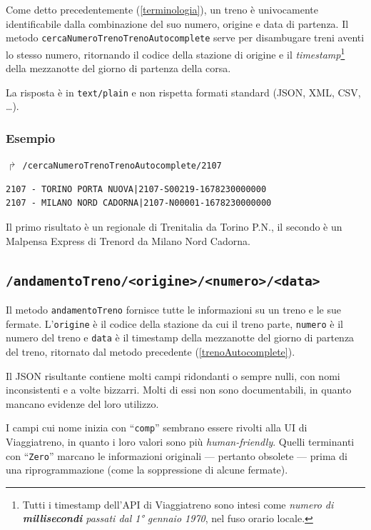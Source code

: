 \documentclass[12pt,italian]{report}
\begin{document}
Come detto precedentemente (\ref{terminologia}), un treno è
univocamente identificabile dalla combinazione del suo numero, origine
e data di partenza.  Il metodo
\texttt{cerca\-Numero\-Treno\-Treno\-Autocomplete} serve per
disambugare treni aventi lo stesso numero, ritornando il codice della
stazione di origine e il
\textit{timestamp}\footnote{\label{timestamp}Tutti i timestamp
    dell'API di Viaggiatreno sono intesi come \textit{numero di
        \textbf{millisecondi} passati dal 1° gennaio 1970}, nel fuso
    orario locale.} della mezzanotte del giorno di partenza della
corsa.

La risposta è in \texttt{text/plain} e non rispetta formati standard
(JSON, XML, CSV, \dots).

\subsubsection{Esempio}

$\Rsh$ \texttt{/cercaNumeroTrenoTrenoAutocomplete/2107}

\begin{verbatim}
2107 - TORINO PORTA NUOVA|2107-S00219-1678230000000
2107 - MILANO NORD CADORNA|2107-N00001-1678230000000
\end{verbatim}

Il primo risultato è un regionale di Trenitalia da Torino P.N., il
secondo è un Malpensa Express di Trenord da Milano Nord Cadorna.

\subsection{\texttt{/andamentoTreno/<origine>/<numero>/<data>}}
\label{andamentoTreno}

Il metodo \texttt{andamentoTreno} fornisce tutte le informazioni su un
treno e le sue fermate.  L'\texttt{origine} è il codice della stazione
da cui il treno parte, \texttt{numero} è il numero del treno e
\texttt{data} è il timestamp della mezzanotte del giorno di partenza
del treno, ritornato dal metodo precedente (\ref{trenoAutocomplete}).

Il JSON risultante contiene molti campi ridondanti o sempre nulli, con
nomi inconsistenti e a volte bizzarri.  Molti di essi non sono
documentabili, in quanto mancano evidenze del loro utilizzo.

I campi cui nome inizia con ``\texttt{comp}'' sembrano essere rivolti
alla UI di Viaggiatreno, in quanto i loro valori sono più
\textit{human-friendly}. Quelli terminanti con ``\texttt{Zero}''
marcano le informazioni originali --- pertanto obsolete --- prima di
una riprogrammazione (come la soppressione di alcune fermate).
\end{document}
